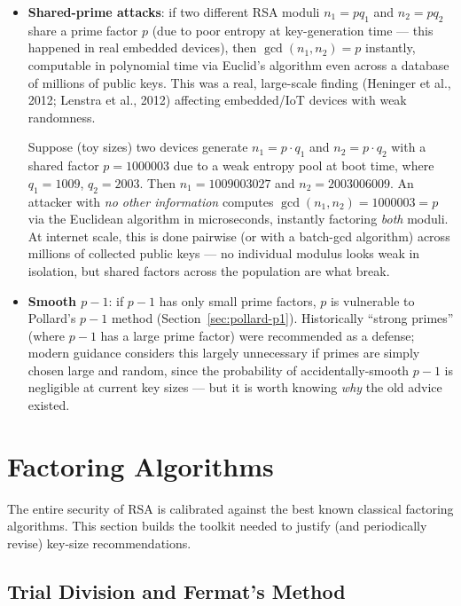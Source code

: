 \begin{itemize}
\item \textbf{Shared-prime attacks}: if two different RSA moduli $n_1 = p q_1$ and $n_2 = p q_2$ share a prime factor $p$ (due to poor entropy at key-generation time — this happened in real embedded devices), then $\gcd(n_1, n_2) = p$ instantly, computable in polynomial time via Euclid's algorithm even across a database of millions of public keys. This was a real, large-scale finding (Heninger et al., 2012; Lenstra et al., 2012) affecting embedded/IoT devices with weak randomness.

\begin{example}
Suppose (toy sizes) two devices generate $n_1 = p \cdot q_1$ and $n_2 = p \cdot q_2$ with a shared factor $p = 1000003$ due to a weak entropy pool at boot time, where $q_1 = 1009$, $q_2 = 2003$. Then $n_1 = 1009003027$ and $n_2 = 2003006009$. An attacker with \emph{no other information} computes $\gcd(n_1, n_2) = 1000003 = p$ via the Euclidean algorithm in microseconds, instantly factoring \emph{both} moduli. At internet scale, this is done pairwise (or with a batch-gcd algorithm) across millions of collected public keys — no individual modulus looks weak in isolation, but shared factors across the population are what break.
\end{example}
\item \textbf{Smooth $p-1$}: if $p - 1$ has only small prime factors, $p$ is vulnerable to Pollard's $p-1$ method (Section~\ref{sec:pollard-p1}). Historically ``strong primes'' (where $p-1$ has a large prime factor) were recommended as a defense; modern guidance considers this largely unnecessary if primes are simply chosen large and random, since the probability of accidentally-smooth $p-1$ is negligible at current key sizes — but it is worth knowing \emph{why} the old advice existed.
\end{itemize}

\newpage
\section{Factoring Algorithms}

The entire security of RSA is calibrated against the best known classical factoring algorithms. This section builds the toolkit needed to justify (and periodically revise) key-size recommendations.

\subsection{Trial Division and Fermat's Method}

